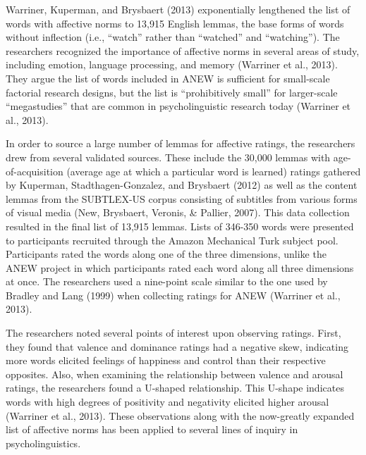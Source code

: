 \documentclass[english,,man]{apa6}
\begin{document}
Warriner, Kuperman, and Brysbaert (2013) exponentially lengthened the
list of words with affective norms to 13,915 English lemmas, the base
forms of words without inflection (i.e., \enquote{watch} rather than
\enquote{watched} and \enquote{watching}). The researchers recognized
the importance of affective norms in several areas of study, including
emotion, language processing, and memory (Warriner et al., 2013). They
argue the list of words included in ANEW is sufficient for small-scale
factorial research designs, but the list is \enquote{prohibitively
small} for larger-scale \enquote{megastudies} that are common in
psycholinguistic research today (Warriner et al., 2013).

In order to source a large number of lemmas for affective ratings, the
researchers drew from several validated sources. These include the
30,000 lemmas with age-of-acquisition (average age at which a particular
word is learned) ratings gathered by Kuperman, Stadthagen-Gonzalez, and
Brysbaert (2012) as well as the content lemmas from the SUBTLEX-US
corpus consisting of subtitles from various forms of visual media (New,
Brysbaert, Veronis, \& Pallier, 2007). This data collection resulted in
the final list of 13,915 lemmas. Lists of 346-350 words were presented
to participants recruited through the Amazon Mechanical Turk subject
pool. Participants rated the words along one of the three dimensions,
unlike the ANEW project in which participants rated each word along all
three dimensions at once. The researchers used a nine-point scale
similar to the one used by Bradley and Lang (1999) when collecting
ratings for ANEW (Warriner et al., 2013).

The researchers noted several points of interest upon observing ratings.
First, they found that valence and dominance ratings had a negative
skew, indicating more words elicited feelings of happiness and control
than their respective opposites. Also, when examining the relationship
between valence and arousal ratings, the researchers found a U-shaped
relationship. This U-shape indicates words with high degrees of
positivity and negativity elicited higher arousal (Warriner et al.,
2013). These observations along with the now-greatly expanded list of
affective norms has been applied to several lines of inquiry in
psycholinguistics.
\end{document}

